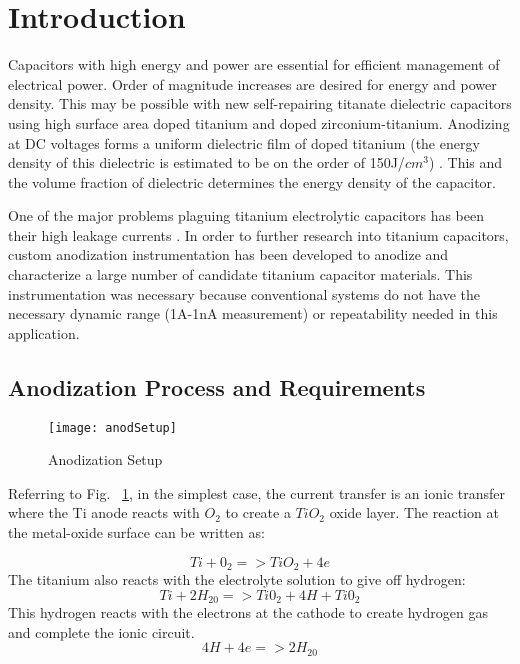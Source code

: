 
\section{Introduction}

Capacitors with high energy and power are essential for efficient management of electrical power.  Order of magnitude increases are desired for energy and power density. This may be possible with new self-repairing titanate dielectric capacitors using high surface area doped titanium and doped zirconium-titanium.  Anodizing at DC voltages forms a uniform dielectric film of doped titanium (the energy density of this dielectric is estimated to be on the order of 150J/$cm^3$) \cite{tiSponge}. This and the volume fraction of dielectric determines the energy density of the capacitor.

One of the major problems plaguing titanium electrolytic capacitors has been their high leakage currents \cite{tiCharHag}. In order to further research into titanium capacitors, custom anodization instrumentation has been developed to anodize and characterize a large number of candidate titanium capacitor materials. This instrumentation was necessary because conventional systems do not have the necessary dynamic range (1A-1nA measurement) or repeatability needed in this application.


\subsection{Anodization Process and Requirements}


\begin{figure}[here]
\centering
\texttt{[image: anodSetup]}
\caption{Anodization Setup}
\label{fig:anodSetup}
\end{figure}


Referring to Fig. ~\ref{fig:anodSetup}, in the simplest case, the current transfer is an ionic transfer where the Ti anode reacts with $O_{2}$ to create a $TiO_{2}$ oxide layer. The reaction at the metal-oxide surface can be written as:

\begin{equation}
Ti + 0_2 => TiO_2 + 4e
\end{equation}
The titanium also reacts with the electrolyte solution to give off hydrogen:
\begin{equation}
Ti + 2H_20 => Ti0_2 + 4H+Ti0_2
\end{equation}
This hydrogen reacts with the electrons at the cathode to create hydrogen gas and complete the ionic circuit.
\begin{equation}
4H + 4e => 2H_20
\end{equation}

